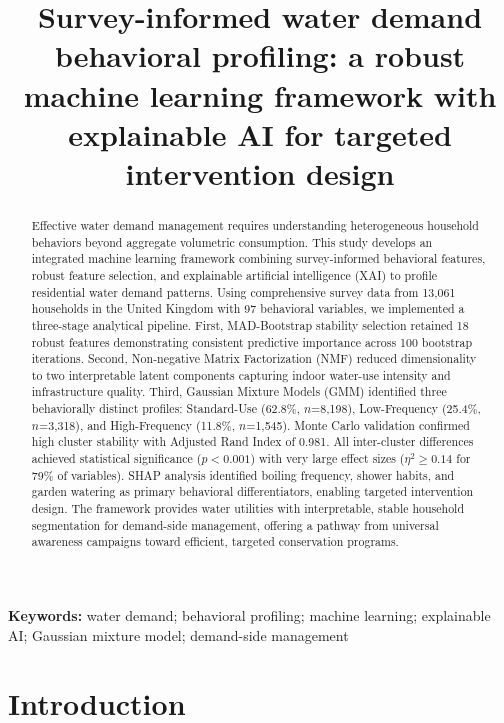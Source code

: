 \documentclass[a4paper,12pt]{article}
\title{Survey-informed water demand behavioral profiling: a robust machine learning framework with explainable AI for targeted intervention design}
\author{} %
\date{}
\begin{document}
\maketitle

\begin{abstract}
Effective water demand management requires understanding heterogeneous household behaviors beyond aggregate volumetric consumption. This study develops an integrated machine learning framework combining survey-informed behavioral features, robust feature selection, and explainable artificial intelligence (XAI) to profile residential water demand patterns. Using comprehensive survey data from 13,061 households in the United Kingdom with 97 behavioral variables, we implemented a three-stage analytical pipeline. First, MAD-Bootstrap stability selection retained 18 robust features demonstrating consistent predictive importance across 100 bootstrap iterations. Second, Non-negative Matrix Factorization (NMF) reduced dimensionality to two interpretable latent components capturing indoor water-use intensity and infrastructure quality. Third, Gaussian Mixture Models (GMM) identified three behaviorally distinct profiles: Standard-Use (62.8\%, $n$=8,198), Low-Frequency (25.4\%, $n$=3,318), and High-Frequency (11.8\%, $n$=1,545). Monte Carlo validation confirmed high cluster stability with Adjusted Rand Index of 0.981. All inter-cluster differences achieved statistical significance ($p<0.001$) with very large effect sizes ($\eta^2 \geq 0.14$ for 79\% of variables). SHAP analysis identified boiling frequency, shower habits, and garden watering as primary behavioral differentiators, enabling targeted intervention design. The framework provides water utilities with interpretable, stable household segmentation for demand-side management, offering a pathway from universal awareness campaigns toward efficient, targeted conservation programs.
\end{abstract}

\textbf{Keywords:} water demand; behavioral profiling; machine learning; explainable AI; Gaussian mixture model; demand-side management

\section{Introduction}
\end{document}
